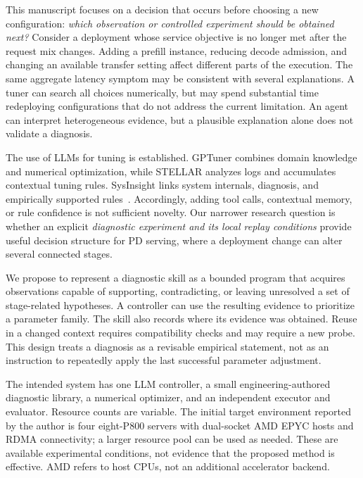 \documentclass[11pt,a4paper]{article}
\begin{document}
This manuscript focuses on a decision that occurs before choosing a new configuration: \emph{which observation or controlled experiment should be obtained next?} Consider a deployment whose service objective is no longer met after the request mix changes. Adding a prefill instance, reducing decode admission, and changing an available transfer setting affect different parts of the execution. The same aggregate latency symptom may be consistent with several explanations. A tuner can search all choices numerically, but may spend substantial time redeploying configurations that do not address the current limitation. An agent can interpret heterogeneous evidence, but a plausible explanation alone does not validate a diagnosis.

The use of LLMs for tuning is established. GPTuner combines domain knowledge and numerical optimization, while STELLAR analyzes logs and accumulates contextual tuning rules. SysInsight links system internals, diagnosis, and empirically supported rules~\cite{gptuner2024,stellar2025,sysinsight2026}. Accordingly, adding tool calls, contextual memory, or rule confidence is not sufficient novelty. Our narrower research question is whether an explicit \emph{diagnostic experiment and its local replay conditions} provide useful decision structure for PD serving, where a deployment change can alter several connected stages.

We propose to represent a diagnostic skill as a bounded program that acquires observations capable of supporting, contradicting, or leaving unresolved a set of stage-related hypotheses. A controller can use the resulting evidence to prioritize a parameter family. The skill also records where its evidence was obtained. Reuse in a changed context requires compatibility checks and may require a new probe. This design treats a diagnosis as a revisable empirical statement, not as an instruction to repeatedly apply the last successful parameter adjustment.

The intended system has one LLM controller, a small engineering-authored diagnostic library, a numerical optimizer, and an independent executor and evaluator. Resource counts are variable. The initial target environment reported by the author is four eight-P800 servers with dual-socket AMD EPYC hosts and RDMA connectivity; a larger resource pool can be used as needed. These are available experimental conditions, not evidence that the proposed method is effective. AMD refers to host CPUs, not an additional accelerator backend.
\end{document}
